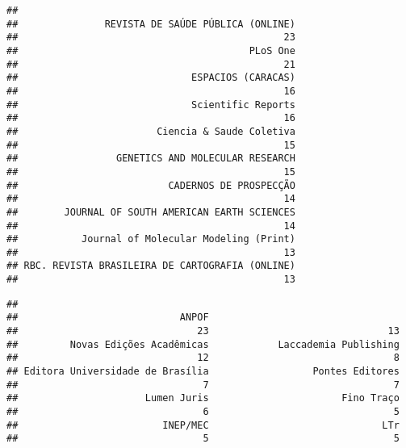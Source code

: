 \documentclass[]{article}
\newenvironment{Shaded}{\begin{snugshade}}{\end{snugshade}}
\newcommand{\KeywordTok}[1]{\textcolor[rgb]{0.13,0.29,0.53}{\textbf{#1}}}
\newcommand{\DataTypeTok}[1]{\textcolor[rgb]{0.13,0.29,0.53}{#1}}
\newcommand{\DecValTok}[1]{\textcolor[rgb]{0.00,0.00,0.81}{#1}}
\newcommand{\StringTok}[1]{\textcolor[rgb]{0.31,0.60,0.02}{#1}}
\newcommand{\OtherTok}[1]{\textcolor[rgb]{0.56,0.35,0.01}{#1}}
\newcommand{\OperatorTok}[1]{\textcolor[rgb]{0.81,0.36,0.00}{\textbf{#1}}}
\newcommand{\NormalTok}[1]{#1}
\begin{document}
\begin{verbatim}
## 
##               REVISTA DE SAÚDE PÚBLICA (ONLINE) 
##                                              23 
##                                        PLoS One 
##                                              21 
##                              ESPACIOS (CARACAS) 
##                                              16 
##                              Scientific Reports 
##                                              16 
##                        Ciencia & Saude Coletiva 
##                                              15 
##                 GENETICS AND MOLECULAR RESEARCH 
##                                              15 
##                          CADERNOS DE PROSPECÇÃO 
##                                              14 
##        JOURNAL OF SOUTH AMERICAN EARTH SCIENCES 
##                                              14 
##           Journal of Molecular Modeling (Print) 
##                                              13 
## RBC. REVISTA BRASILEIRA DE CARTOGRAFIA (ONLINE) 
##                                              13
\end{verbatim}

\begin{Shaded}
\end{Shaded}

\begin{verbatim}
## 
##                            ANPOF                                  
##                               23                               13 
##         Novas Edições Acadêmicas            Laccademia Publishing 
##                               12                                8 
## Editora Universidade de Brasília                  Pontes Editores 
##                                7                                7 
##                      Lumen Juris                       Fino Traço 
##                                6                                5 
##                         INEP/MEC                              LTr 
##                                5                                5
\end{verbatim}
\end{document}
